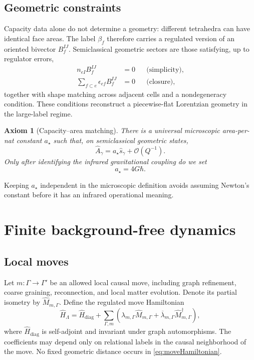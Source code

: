 \documentclass[11pt]{article}
\newtheorem{axiom}[definition]{Axiom}
\theoremstyle{remark}
\newcommand{\order}{\mathcal O}
\begin{document}
\subsection{Geometric constraints}

Capacity data alone do not determine a geometry: different tetrahedra can
have identical face areas.  The label \(\beta_f\) therefore carries a
regulated version of an oriented bivector \(B_f^{IJ}\).  Semiclassical
geometric sectors are those satisfying, up to regulator errors,
\begin{align}
 n_{eI}B_f^{IJ}&=0
 &&\text{(simplicity)}, \label{eq:simplicity}\\
 \sum_{f\subset e}\epsilon_{ef}B_f^{IJ}&=0
 &&\text{(closure)}, \label{eq:closure}
\end{align}
together with shape matching across adjacent cells and a nondegeneracy
condition.  These conditions reconstruct a piecewise-flat Lorentzian
geometry in the large-label regime.

\begin{axiom}[Capacity--area matching]
There is a universal microscopic area-per-nat constant \(a_\star\) such
that, on semiclassical geometric states,
\begin{equation}
  \widehat A_\gamma=a_\star\widehat s_\gamma
  +\order(Q^{-1}).
  \label{eq:areaCapacity}
\end{equation}
Only after identifying the infrared gravitational coupling do we set
\begin{equation}
  a_\star=4G\hbar.
  \label{eq:aStar}
\end{equation}
\end{axiom}

Keeping \(a_\star\) independent in the microscopic definition avoids
assuming Newton's constant before it has an infrared operational meaning.

\section{Finite background-free dynamics}

\subsection{Local moves}

Let \(m:\Gamma\rightarrow\Gamma'\) be an allowed local causal move,
including graph refinement, coarse graining, reconnection, and local
matter evolution.  Denote its partial isometry by
\(\widehat M_{m,\Gamma}\).  Define the regulated move Hamiltonian
\begin{equation}
  \widehat H_\Lambda
  =
  \widehat H_{\mathrm{diag}}
  +\sum_{\Gamma,m}
   \left(
     \lambda_{m,\Gamma}\widehat M_{m,\Gamma}
     +\overline{\lambda}_{m,\Gamma}
      \widehat M_{m,\Gamma}^{\dagger}
   \right),
  \label{eq:moveHamiltonian}
\end{equation}
where \(\widehat H_{\mathrm{diag}}\) is self-adjoint and invariant under
graph automorphisms.  The coefficients may depend only on relational
labels in the causal neighborhood of the move.  No fixed geometric
distance occurs in \eqref{eq:moveHamiltonian}.
\end{document}
